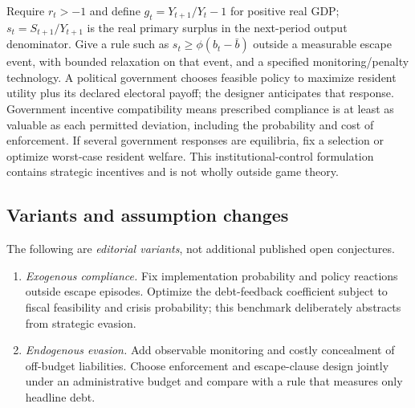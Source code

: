 \documentclass[11pt,a4paper]{article}
\begin{document}
Require \(r_t>-1\) and define \(g_t=Y_{t+1}/Y_t-1\) for positive real GDP; \(s_t=S_{t+1}/Y_{t+1}\) is the real primary surplus in the next-period output denominator. Give a rule such as \(s_t\ge\phi(b_t-\bar b)\) outside a measurable escape event, with bounded relaxation on that event, and a specified monitoring/penalty technology. A political government chooses feasible policy to maximize resident utility plus its declared electoral payoff; the designer anticipates that response. Government incentive compatibility means prescribed compliance is at least as valuable as each permitted deviation, including the probability and cost of enforcement. If several government responses are equilibria, fix a selection or optimize worst-case resident welfare. This institutional-control formulation contains strategic incentives and is not wholly outside game theory.
\subsection*{Variants and assumption changes}
The following are \emph{editorial variants}, not additional published open conjectures.
\begin{enumerate}
\item \emph{Exogenous compliance.} Fix implementation probability and policy reactions outside escape episodes. Optimize the debt-feedback coefficient subject to fiscal feasibility and crisis probability; this benchmark deliberately abstracts from strategic evasion.
\item \emph{Endogenous evasion.} Add observable monitoring and costly concealment of off-budget liabilities. Choose enforcement and escape-clause design jointly under an administrative budget and compare with a rule that measures only headline debt.
\end{enumerate}
\end{document}
